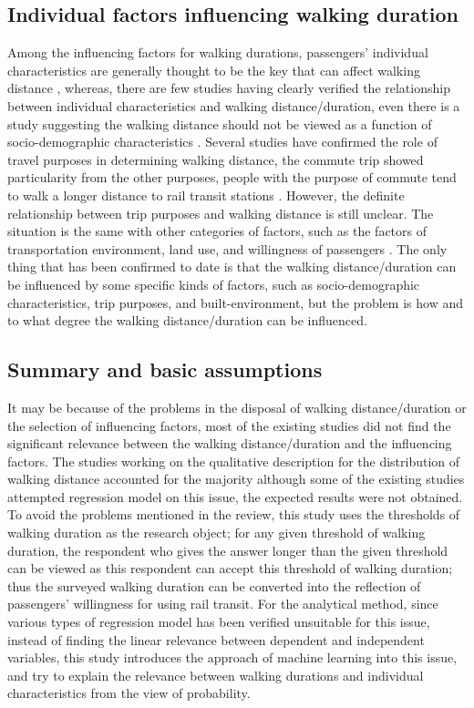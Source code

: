 \documentclass[Journal,letterpaper]{ascelike-new}
\begin{document}
\subsection{Individual factors influencing walking duration}
%
Among the influencing factors for walking durations, passengers' individual characteristics are generally thought to be the key that can affect walking distance \cite{besser2005walking,weinstein2008far,krygsman2004multimodal,yang2012walking,daniels2013explaining,guerra2012half}, whereas, there are few studies having clearly verified the relationship between individual characteristics and walking distance/duration, even there is a study suggesting the walking distance should not be viewed as a function of socio-demographic characteristics \cite{krygsman2004multimodal}. Several studies have confirmed the role of travel purposes in determining walking distance, the commute trip showed particularity from the other purposes, people with the purpose of commute tend to walk a longer distance to rail transit stations \cite{larsen2010beyond}. However, the definite relationship between trip purposes and walking distance is still unclear. The situation is the same with other categories of factors, such as the factors of transportation environment, land use, and willingness of passengers \cite{guerra2012half,krygsman2004multimodal,weinstein2008far}. The only thing that has been confirmed to date is that the walking distance/duration can be influenced by some specific kinds of factors, such as socio-demographic characteristics, trip purposes, and built-environment, but the problem is how and to what degree the walking distance/duration can be influenced.

%
\subsection{Summary and basic assumptions}
%
It may be because of the problems in the disposal of walking distance/duration or the selection of influencing factors, most of the existing studies did not find the significant relevance between the walking distance/duration and the influencing factors. The studies working on the qualitative description for the distribution of walking distance accounted for the majority although some of the existing studies attempted regression model on this issue, the expected results were not obtained. To avoid the problems mentioned in the review, this study uses the thresholds of walking duration as the research object; for any given threshold of walking duration, the respondent who gives the answer longer than the given threshold can be viewed as this respondent can accept this threshold of walking duration; thus the surveyed walking duration can be converted into the reflection of passengers' willingness for using rail transit. For the analytical method, since various types of regression model has been verified unsuitable for this issue, instead of finding the linear relevance between dependent and independent variables, this study introduces the approach of machine learning into this issue, and try to explain the relevance between walking durations and individual characteristics from the view of probability.
\end{document}

